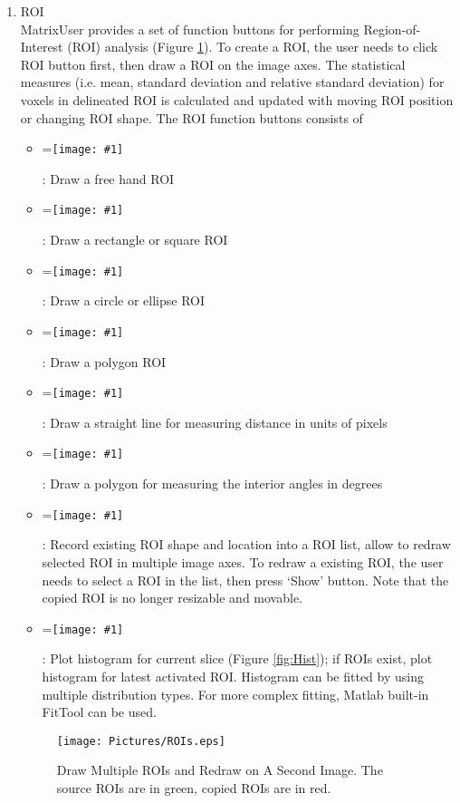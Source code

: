 \documentclass{article}%
\newcommand{\vcenteredinclude}[1]{
\begingroup
\setbox0=\hbox{\texttt{[image: \#1]}}
\parbox{\wd0}{\box0}\endgroup}
\begin{document}
\begin{enumerate}
\begin{itemize}
	\end{itemize}
	
	
	\item ROI \\
	
MatrixUser provides a set of function buttons for performing Region-of-Interest (ROI) analysis (Figure \ref{fig:ROIs}). To create a ROI, the user needs to click ROI button first, then draw a ROI on the image axes. The statistical measures (i.e. mean, standard deviation and relative standard deviation) for voxels in delineated ROI is calculated and updated with moving ROI position or changing ROI shape. The ROI function buttons consists of

	\begin{itemize}
		\item \vcenteredinclude{Pictures/FreeROI.eps} : Draw a free hand ROI
		\item \vcenteredinclude{Pictures/RectangleROI.eps} : Draw a rectangle or square ROI
		\item \vcenteredinclude{Pictures/CircleROI.eps} : Draw a circle or ellipse ROI
		\item \vcenteredinclude{Pictures/PolygonROI.eps} : Draw a polygon ROI
		\item \vcenteredinclude{Pictures/LineROI.eps} : Draw a straight line for measuring distance in units of pixels
		\item \vcenteredinclude{Pictures/AngleROI.eps} : Draw a polygon for measuring the interior angles in degrees
		\item \vcenteredinclude{Pictures/ROIManager.eps} : Record existing ROI shape and location into a ROI list, allow to redraw selected ROI in multiple image axes. To redraw a existing ROI, the user needs to select a ROI in the list, then press `Show' button. Note that the copied ROI is no longer resizable and movable.
		\item \vcenteredinclude{Pictures/Histogram.eps} : Plot histogram for current slice (Figure \ref{fig:Hist}); if ROIs exist, plot histogram for latest activated ROI. Histogram can be fitted by using multiple distribution types. For more complex fitting, Matlab built-in FitTool can be used.
	\end{itemize}
	
	\begin{figure}[htbp]
		\centering
			\texttt{[image: Pictures/ROIs.eps]}
		\caption{Draw Multiple ROIs and Redraw on A Second Image. The source ROIs are in green, copied ROIs are in red.}
		\label{fig:ROIs}
	\end{figure}
	

\end{enumerate}
\end{document}
